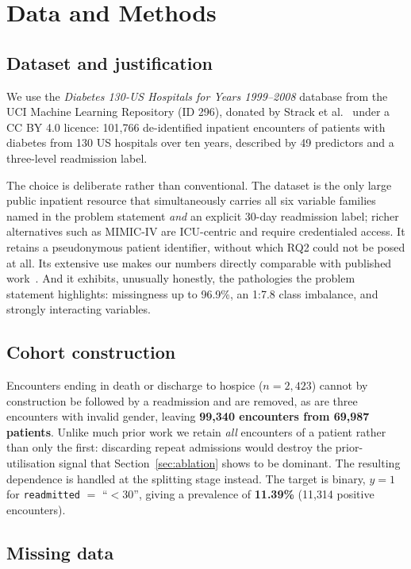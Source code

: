 \documentclass[runningheads]{llncs}
\begin{document}
\section{Data and Methods}

\subsection{Dataset and justification}

We use the \emph{Diabetes 130-US Hospitals for Years 1999--2008} database from the UCI
Machine Learning Repository (ID 296), donated by Strack et al.~\cite{strack2014} under
a CC BY 4.0 licence: 101{,}766 de-identified inpatient encounters of patients with
diabetes from 130 US hospitals over ten years, described by 49 predictors and a
three-level readmission label.

The choice is deliberate rather than conventional. The dataset is the only large
public inpatient resource that simultaneously carries all six variable families named
in the problem statement \emph{and} an explicit 30-day readmission label; richer
alternatives such as MIMIC-IV are ICU-centric and require credentialed access. It
retains a pseudonymous patient identifier, without which RQ2 could not be posed at
all. Its extensive use makes our numbers directly comparable with published
work~\cite{shang2021,lu2022,liu2024}. And it exhibits, unusually honestly, the
pathologies the problem statement highlights: missingness up to 96.9\%, an 1:7.8 class
imbalance, and strongly interacting variables.

\subsection{Cohort construction}

Encounters ending in death or discharge to hospice ($n=2{,}423$) cannot by
construction be followed by a readmission and are removed, as are three encounters
with invalid gender, leaving \textbf{99{,}340 encounters from 69{,}987 patients}.
Unlike much prior work we retain \emph{all} encounters of a patient rather than only
the first: discarding repeat admissions would destroy the prior-utilisation signal
that Section~\ref{sec:ablation} shows to be dominant. The resulting dependence is
handled at the splitting stage instead. The target is binary, $y=1$ for
\texttt{readmitted} $=$ ``$<$30'', giving a prevalence of \textbf{11.39\%}
(11{,}314 positive encounters).

\subsection{Missing data}
\end{document}
